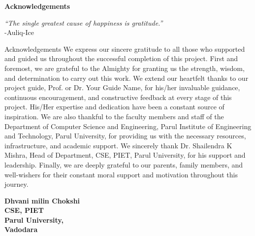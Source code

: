\thispagestyle{empty}
\newpage
\cleardoublepage{}
{}
\begin{center}
{\Large \bf Acknowledgements}\\
\end{center}
\vspace{10pt}
\begin{flushright}
\textit{“The single greatest cause of happiness is gratitude.” }\\
\vspace{5mm}
-Auliq-Ice
\end{flushright}
\hspace{10mm}Acknowledgements
We express our sincere gratitude to all those who supported and guided us throughout the
successful completion of this project. First and foremost, we are grateful to the Almighty for granting us the strength, wisdom, and determination to carry out this work.
We extend our heartfelt thanks to our project guide, Prof. or Dr. Your Guide Name, for his/her invaluable guidance, continuous encouragement, and constructive feedback at every stage of this project. His/Her expertise and dedication have been a constant source of inspiration.
We are also thankful to the faculty members and staff of the Department of Computer
Science and Engineering, Parul Institute of Engineering and Technology, Parul University, for
providing us with the necessary resources, infrastructure, and academic support.
We sincerely thank Dr. Shailendra K Mishra, Head of Department, CSE, PIET, Parul
University, for his support and leadership. 
Finally, we are deeply grateful to our parents, family members, and well-wishers for their
constant moral support and motivation throughout this journey.

\vspace{1.5cm}
\begin{flushright}
\textbf{Dhvani milin Chokshi \\ CSE, PIET\\ Parul University, \\Vadodara}\\ 
\end{flushright}